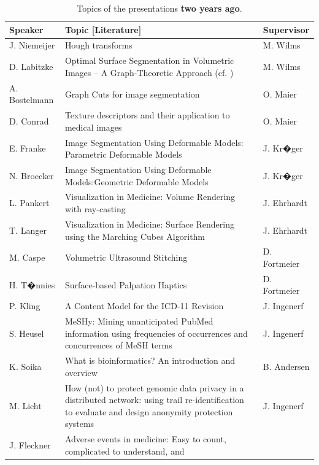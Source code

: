 \documentclass[
12pt,
headsepline,
bibliography=totoc,
twoside=semi,
fleqn
]{scrartcl}
\begin{document}
\begin{table}[t]
    \footnotesize
    \caption{\label{tab:table1} Topics of the presentations \textbf{two years ago}.}
    \vspace{1ex}
    \centering 
    \begin{tabular}{p{2.5cm}p{8.7cm}p{2.8cm}}
        \toprule
        \textbf{Speaker} & \textbf{Topic [Literature]} & \textbf{Supervisor} \\
        \midrule
        J. Niemeijer & Hough transforms & M. Wilms \\
        D. Labitzke & Optimal Surface Segmentation in Volumetric Images -- A Graph-Theoretic Approach (cf. \citep{Li_TPAMI_2006}) & M. Wilms \\
        A. Bostelmann & Graph Cuts for image segmentation
        & O. Maier \\
        D. Conrad & Texture descriptors and their application to medical images & O. Maier
        \\
        E. Franke & Image Segmentation Using Deformable Models: Parametric Deformable
        Models & J. Kr�ger \\
        N. Broecker & Image Segmentation Using Deformable Models:Geometric Deformable
        Models & J. Kr�ger \\
        L. Pankert & Visualization in Medicine: Volume Rendering with ray-casting
        & J. Ehrhardt \\
        T. Langer & Visualization in Medicine: Surface Rendering using the Marching Cubes
        Algorithm & J. Ehrhardt \\
        M. Caspe & Volumetric Ultrasound Stitching & D. Fortmeier \\
        H. T�nnies & Surface-based Palpation Haptics & D. Fortmeier \\
        \midrule
        P. Kling & A Content Model for the ICD-11 Revision & J. Ingenerf \\
        S. Heusel & MeSHy: Mining unanticipated PubMed information using frequencies of
        occurrences and concurrences of MeSH terms & J. Ingenerf \\
        K. Soika & What is bioinformatics? An introduction and overview & B. Andersen \\
        M. Licht & How (not) to protect genomic data privacy in a distributed network: using trail
        re-identification to evaluate and design anonymity protection systems & J. Ingenerf \\
        J. Fleckner & Adverse events in medicine: Easy to count, complicated to understand, and

\end{tabular}
\end{table}
\end{document}
